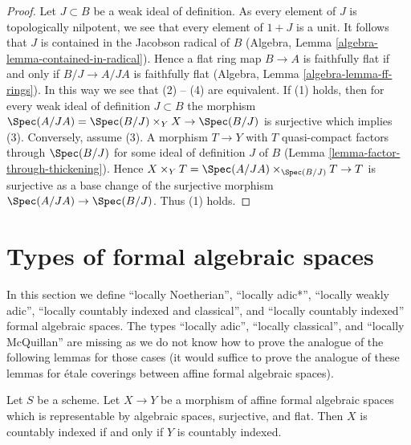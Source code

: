 \begin{proof}
Let $J \subset B$ be a weak ideal of definition. As every element of $J$
is topologically nilpotent, we see that every element of $1 + J$ is
a unit. It follows that $J$ is contained in the Jacobson radical of $B$
(Algebra, Lemma \ref{algebra-lemma-contained-in-radical}).
Hence a flat ring map $B \to A$ is faithfully flat if and only if
$B/J \to A/JA$ is faithfully flat
(Algebra, Lemma \ref{algebra-lemma-ff-rings}).
In this way we see that (2) -- (4) are equivalent.
If (1) holds, then for every weak ideal of definition $J \subset B$
the morphism
$\Spec(A/JA) = \Spec(B/J) \times_Y X \to \Spec(B/J)$ is surjective
which implies (3). Conversely, assume (3).
A morphism $T \to Y$ with $T$ quasi-compact
factors through $\Spec(B/J)$ for some ideal of definition $J$ of $B$
(Lemma \ref{lemma-factor-through-thickening}).
Hence $X \times_Y T = \Spec(A/JA) \times_{\Spec(B/J)} T \to T$
is surjective as a base change of the surjective morphism
$\Spec(A/JA) \to \Spec(B/J)$. Thus (1) holds.
\end{proof}





\section{Types of formal algebraic spaces}
\label{section-types}

\noindent
In this section we define
``locally Noetherian'',
``locally adic*'',
``locally weakly adic'',
``locally countably indexed and classical'', and
``locally countably indexed''
formal algebraic spaces. The types
``locally adic'',
``locally classical'', and
``locally McQuillan''
are missing as we do not know how to prove the analogue of the following
lemmas for those cases (it would suffice to prove the analogue of these
lemmas for \'etale coverings between affine formal algebraic spaces).

\begin{lemma}
\label{lemma-iff-countably-indexed}
Let $S$ be a scheme. Let $X \to Y$ be a morphism of affine
formal algebraic spaces which is representable by algebraic spaces,
surjective, and flat. Then $X$ is countably indexed if and only
if $Y$ is countably indexed.
\end{lemma}

